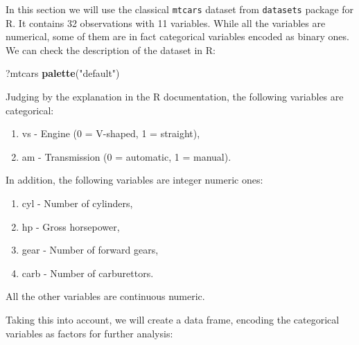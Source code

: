 \documentclass[
]{book}
\newenvironment{Shaded}{\begin{snugshade}}{\end{snugshade}}
\newcommand{\AttributeTok}[1]{\textcolor[rgb]{0.13,0.29,0.53}{#1}}
\newcommand{\DecValTok}[1]{\textcolor[rgb]{0.00,0.00,0.81}{#1}}
\newcommand{\FunctionTok}[1]{\textcolor[rgb]{0.13,0.29,0.53}{\textbf{#1}}}
\newcommand{\NormalTok}[1]{#1}
\newcommand{\OtherTok}[1]{\textcolor[rgb]{0.56,0.35,0.01}{#1}}
\newcommand{\SpecialCharTok}[1]{\textcolor[rgb]{0.81,0.36,0.00}{\textbf{#1}}}
\newcommand{\StringTok}[1]{\textcolor[rgb]{0.31,0.60,0.02}{#1}}
\providecommand{\tightlist}{%
  \setlength{\itemsep}{0pt}\setlength{\parskip}{0pt}}
\theoremstyle{definition}
\theoremstyle{definition}
\theoremstyle{definition}
\theoremstyle{definition}
\theoremstyle{remark}
\begin{document}
In this section we will use the classical \texttt{mtcars} dataset from \texttt{datasets} package for R. It contains 32 observations with 11 variables. While all the variables are numerical, some of them are in fact categorical variables encoded as binary ones. We can check the description of the dataset in R:

\begin{Shaded}
\begin{Highlighting}[]
\NormalTok{?mtcars}
\FunctionTok{palette}\NormalTok{(}\StringTok{"default"}\NormalTok{)}
\end{Highlighting}
\end{Shaded}

Judging by the explanation in the R documentation, the following variables are categorical:

\begin{enumerate}
\def\labelenumi{\arabic{enumi}.}
\tightlist
\item
  vs - Engine (0 = V-shaped, 1 = straight),
\item
  am - Transmission (0 = automatic, 1 = manual).
\end{enumerate}

In addition, the following variables are integer numeric ones:

\begin{enumerate}
\def\labelenumi{\arabic{enumi}.}
\tightlist
\item
  cyl - Number of cylinders,
\item
  hp - Gross horsepower,
\item
  gear - Number of forward gears,
\item
  carb - Number of carburettors.
\end{enumerate}

All the other variables are continuous numeric.

Taking this into account, we will create a data frame, encoding the categorical variables as factors for further analysis:

\begin{Shaded}
\end{Shaded}
\end{document}
